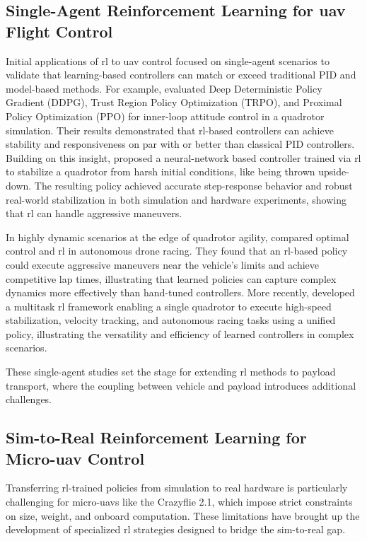 \subsection{Single-Agent Reinforcement Learning for \gls{uav} Flight Control}

Initial applications of \gls{rl} to \gls{uav} control focused on single-agent scenarios to validate that learning-based controllers can match or exceed traditional PID and model-based methods. For example, \cite{Koch2018ReinforcementLF} evaluated Deep Deterministic Policy Gradient (DDPG), Trust Region Policy Optimization (TRPO), and Proximal Policy Optimization (PPO) for inner-loop attitude control in a quadrotor simulation. Their results demonstrated that \gls{rl}-based controllers can achieve stability and responsiveness on par with or better than classical PID controllers. Building on this insight, \cite{Hwangbo2017ControlOA} proposed a neural-network based controller trained via \gls{rl} to stabilize a quadrotor from harsh initial conditions, like being thrown upside-down. The resulting policy achieved accurate step-response behavior and robust real-world stabilization in both simulation and hardware experiments, showing that \gls{rl} can handle aggressive maneuvers.

In highly dynamic scenarios at the edge of quadrotor agility, \cite{Song2023ReachingTL} compared optimal control and \gls{rl} in autonomous drone racing. They found that an \gls{rl}-based policy could execute aggressive maneuvers near the vehicle's limits and achieve competitive lap times, illustrating that learned policies can capture complex dynamics more effectively than hand-tuned controllers. More recently, \cite{xing_multi-task_2024} developed a multitask \gls{rl} framework enabling a single quadrotor to execute high-speed stabilization, velocity tracking, and autonomous racing tasks using a unified policy, illustrating the versatility and efficiency of learned controllers in complex scenarios. 

These single-agent studies set the stage for extending \gls{rl} methods to payload transport, where the coupling between vehicle and payload introduces additional challenges.

\subsection{Sim-to-Real Reinforcement Learning for Micro-\gls{uav} Control}
Transferring \gls{rl}-trained policies from simulation to real hardware is particularly challenging for micro-\gls{uav}s like the Crazyflie 2.1, which impose strict constraints on size, weight, and onboard computation. These limitations have brought up the development of specialized \gls{rl} strategies designed to bridge the sim-to-real gap.

